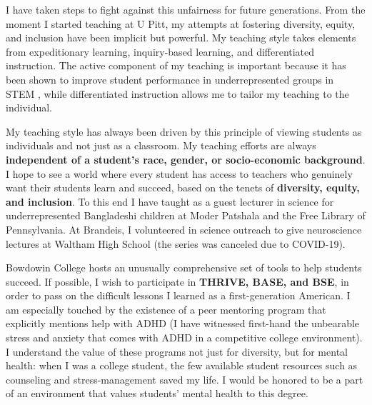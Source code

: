 \documentclass[a4paper,11pt]{article}
\begin{document}
I have taken steps to fight against this unfairness for future generations. From the moment I started teaching at U Pitt, my attempts at fostering diversity, equity, and inclusion have been implicit but powerful. My teaching style takes elements from expeditionary learning, inquiry-based learning, and differentiated instruction. The active component of my teaching is important because it has been shown to improve student performance in underrepresented groups in STEM \cite{theobald2020active}, while differentiated instruction allows me to tailor my teaching to the individual.

My teaching style has always been driven by this principle of viewing students as individuals and not just as a classroom. My teaching efforts are always \textbf{independent of a student's race, gender, or socio-economic background}. I hope to see a world where every student has access to teachers who genuinely want their students learn and succeed, based on the tenets of \textbf{diversity, equity, and inclusion}. To this end I have taught as a guest lecturer in science for underrepresented Bangladeshi children at Moder Patshala and the Free Library of Pennsylvania. At Brandeis, I volunteered in science outreach to give neuroscience lectures at Waltham High School (the series was canceled due to COVID-19).

Bowdowin College hosts an unusually comprehensive set of tools to help students succeed. If possible, I wish to participate in \textbf{THRIVE, BASE, and BSE}, in order to pass on the difficult lessons I learned as a first-generation American. I am especially touched by the existence of a peer mentoring program that explicitly mentions help with ADHD (I have witnessed first-hand the unbearable stress and anxiety that comes with ADHD in a competitive college environment). I understand the value of these programs not just for diversity, but for mental health: when I was a college student, the few available student resources such as counseling and stress-management saved my life. I would be honored to be a part of an environment that values students' mental health to this degree.
\end{document}
